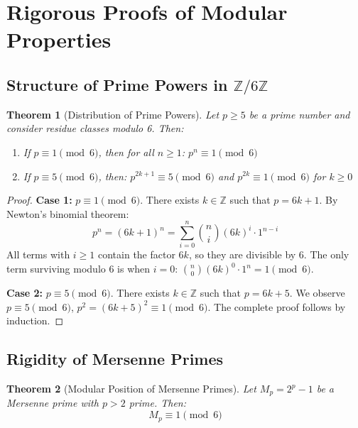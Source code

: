 \documentclass[12pt, a4paper]{article}
\theoremstyle{plain}
\newtheorem{teorema}{Theorem}[section]
\theoremstyle{definition}
\theoremstyle{remark}
\begin{document}
\section{Rigorous Proofs of Modular Properties}
\label{ap:demostraciones}

\subsection{Structure of Prime Powers in \texorpdfstring{$\mathbb{Z}/6\mathbb{Z}$}{Z/6Z}}
\label{ap:estructura_potencias}

\begin{teorema}[Distribution of Prime Powers]
\label{teo:distribucion_potencias_primos}
Let $p \geq 5$ be a prime number and consider residue classes modulo 6. Then:
\begin{enumerate}
    \item If $p \equiv 1 \pmod{6}$, then for all $n \geq 1$: $p^n \equiv 1 \pmod{6}$
    \item If $p \equiv 5 \pmod{6}$, then: $p^{2k+1} \equiv 5 \pmod{6}$ and $p^{2k} \equiv 1 \pmod{6}$ for $k \geq 0$
\end{enumerate}
\end{teorema}

\begin{proof}
\textbf{Case 1:} $p \equiv 1 \pmod{6}$. There exists $k \in \mathbb{Z}$ such that $p = 6k + 1$. By Newton's binomial theorem:
\[
p^n = (6k + 1)^n = \sum_{i=0}^{n} \binom{n}{i} (6k)^i \cdot 1^{n-i}
\]
All terms with $i \geq 1$ contain the factor $6k$, so they are divisible by 6. The only term surviving modulo 6 is when $i = 0$: $\binom{n}{0} (6k)^0 \cdot 1^n = 1 \pmod{6}$.

\textbf{Case 2:} $p \equiv 5 \pmod{6}$. There exists $k \in \mathbb{Z}$ such that $p = 6k + 5$. We observe $p \equiv 5 \pmod{6}$, $p^2 = (6k+5)^2 \equiv 1 \pmod{6}$. The complete proof follows by induction.
\end{proof}

\subsection{Rigidity of Mersenne Primes}
\label{ap:mersenne}

\begin{teorema}[Modular Position of Mersenne Primes]
\label{teo:mersenne_mod_6}
Let $M_p = 2^p - 1$ be a Mersenne prime with $p > 2$ prime. Then:
\[
M_p \equiv 1 \pmod{6}
\]
\end{teorema}
\end{document}
